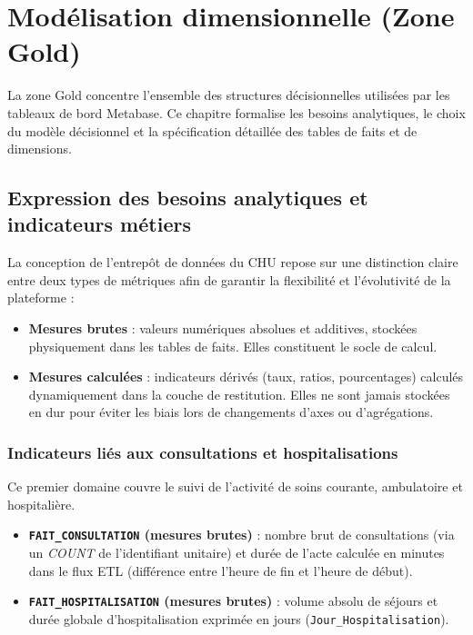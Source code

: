 \documentclass[12pt, a4paper]{report}
\newcommand{\code}[1]{\texttt{#1}}
\begin{document}
\chapter{Modélisation dimensionnelle (Zone Gold)}

La zone Gold concentre l’ensemble des structures décisionnelles utilisées par les tableaux de bord Metabase. Ce chapitre formalise les besoins analytiques, le choix du modèle décisionnel et la spécification détaillée des tables de faits et de dimensions.

\section{Expression des besoins analytiques et indicateurs métiers}

La conception de l’entrepôt de données du CHU repose sur une distinction claire entre deux types de métriques afin de garantir la flexibilité et l’évolutivité de la plateforme :

\begin{itemize}[label=\textcolor{chuBlue}{\textbullet}]
  \item \textbf{Mesures brutes} : valeurs numériques absolues et additives, stockées physiquement dans les tables de faits. Elles constituent le socle de calcul.
  \item \textbf{Mesures calculées} : indicateurs dérivés (taux, ratios, pourcentages) calculés dynamiquement dans la couche de restitution. Elles ne sont jamais stockées en dur pour éviter les biais lors de changements d’axes ou d’agrégations.
\end{itemize}

\subsection{Indicateurs liés aux consultations et hospitalisations}

Ce premier domaine couvre le suivi de l’activité de soins courante, ambulatoire et hospitalière.

\begin{itemize}[label=\textcolor{chuBlue}{\textbullet}]
  \item \textbf{\code{FAIT\_CONSULTATION} (mesures brutes)} :  
  nombre brut de consultations (via un \textit{COUNT} de l’identifiant unitaire) et durée de l’acte calculée en minutes dans le flux ETL (différence entre l’heure de fin et l’heure de début).
  \item \textbf{\code{FAIT\_HOSPITALISATION} (mesures brutes)} :  
  volume absolu de séjours et durée globale d’hospitalisation exprimée en jours (\code{Jour\_Hospitalisation}). 
\end{itemize}
\end{document}
